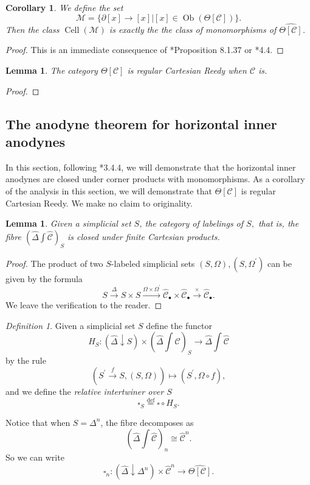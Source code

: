 \documentclass[leqno]{article}
\numberwithin{equation}{subsection}
\theoremstyle{plain}   %
\newtheorem{cor}[equation]{Corollary}
\newtheorem{lemma}[equation]{Lemma}
\theoremstyle{remark}
\newtheorem{defn}[equation]{Definition}
\theoremstyle{plain}
\DeclareMathOperator{\Ob}{Ob}
\newcommand{\overcat}[2]{{\left(#1\downarrow #2\right)}}
\newcommand{\psh}[1]{\ensuremath{\widehat{#1}}}
\newcommand{\C}{\ensuremath{\mathcal{C}}}
\newcommand{\defeq}{\overset{\mathrm{def}}=}
\newcommand{\cellset}{\ensuremath{\widehat{\Theta[\mathcal{C}]}}}
\newcommand{\ssetlab}{\ensuremath{\widehat{\Delta} \int \widehat{\mathcal{C}}}}
\begin{document}
\begin{cor} 
	We define the set
	\[\mathscr{M}=\{\partial[x] \to [x]| [x]\in \Ob(\Theta[\C])\}.\]  Then the class \(\operatorname{Cell}(\mathscr{M})\) is exactly the the class of monomorphisms of \(\cellset\).  
\end{cor}
\begin{proof}
	This is an immediate consequence of \cite{cisinski-book}*{Proposition 8.1.37} or \cite{bergner-rezk-reedy}*{4.4}.
\end{proof}
\begin{lemma} The category \(\Theta[\C]\) is regular Cartesian Reedy when \(\C\) is.
\end{lemma}
\begin{proof}
\end{proof}

\subsection{The anodyne theorem for horizontal inner anodynes}\label{horizontal}
In this section, following \cite{oury}*{3.4.4}, we will demonstrate that the horizontal inner anodynes are closed under corner products with monomorphisms.  As a corollary of the analysis in this section, we will demonstrate that \(\Theta[\C]\) is regular Cartesian Reedy.  We make no claim to originality.

\begin{lemma} Given a simplicial set \(S\), the category of labelings of \(S,\) that is, the fibre \(\left(\ssetlab\right)_S\) is closed under finite Cartesian products. 
\end{lemma}
\begin{proof} The product of two \(S\)-labeled simplicial sets \((S,\Omega), (S,\Omega^\prime)\) can be given by the formula 
	\[S\xrightarrow{\Delta} S\times S \xrightarrow{\Omega\times \Omega^\prime}  \psh{\C}_\bullet \times \psh{\C}_\bullet \xrightarrow{\times} \psh{\C}_\bullet.\]  We leave the verification to the reader.
\end{proof}

\begin{defn} Given a simplicial set \(S\) define the functor 
	\[H_S: \overcat{\psh{\Delta}}{S} \times  \left(\ssetlab\right)_S \to \ssetlab\]
	by the rule
	\[\left(S^\prime \xrightarrow{f} S, (S,\Omega)\right) \mapsto (S^\prime,  \Omega\circ f),\]
	and we define the \emph{relative intertwiner over \(S\)}
	\[\square_S \defeq \square \circ H_S.\]
	
	Notice that when \(S=\Delta^n\), the fibre decomposes as \[\left(\ssetlab\right)_n\cong \psh{\C}^n.\] So we can write 
	\[\square_n:\overcat{\psh{\Delta}}{\Delta^n} \times \psh{\C}^n \to \cellset.\]
\end{defn}
\end{document}
